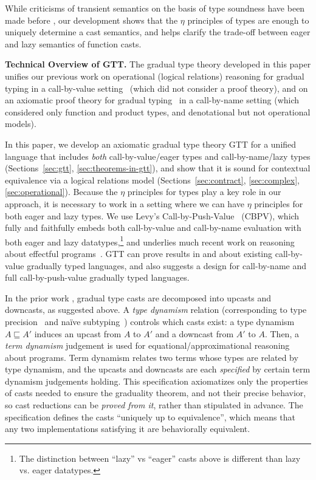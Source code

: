 \documentclass[acmsmall,nonacm]{acmart}
\newcommand{\ltdyn}{\sqsubseteq}
\begin{document}
While criticisms of transient semantics on the basis of type soundness
have been made before \citep{greenmanfelleisen:2018}, our development
shows that the $\eta$ principles of types are enough to uniquely
determine a cast semantics, and helps clarify the trade-off between
eager and lazy semantics of function casts.

\textbf{Technical Overview of GTT.}  The gradual type theory developed
in this paper unifies our previous work on
operational (logical relations) reasoning for gradual typing in a
call-by-value setting~\citep{newahmed18} (which did not consider a proof theory), and on an
axiomatic proof theory for gradual typing~\citep{newlicata2018-fscd} in
a call-by-name setting (which considered only function and product
types, and denotational but not operational models).

In this paper, we develop an axiomatic gradual type theory GTT for a unified
language that includes \emph{both} call-by-value/eager types and
call-by-name/lazy types (Sections~\ref{sec:gtt}, \ref{sec:theorems-in-gtt}), and
show that it is sound for contextual equivalence via a logical relations model
(Sections~\ref{sec:contract}, \ref{sec:complex}, \ref{sec:operational}).
Because the $\eta$ principles for types play a key role in our approach, it is
necessary to work in a setting where we can have $\eta$ principles for both
eager and lazy types.  We use Levy's
Call-by-Push-Value~\citep{levy03cbpvbook} (CBPV), which fully and faithfully
embeds both call-by-value and call-by-name evaluation with both eager and lazy
datatypes,\footnote{The distinction between ``lazy'' vs ``eager'' casts above is
  different than lazy vs. eager datatypes.}  and underlies much recent work on
reasoning about effectful programs~\cite{bauerpretnar13eff,lindley+17frank}.
GTT can prove results in and about existing call-by-value gradually typed
languages, and also suggests a design for call-by-name and full
call-by-push-value gradually typed languages.

In the prior work \cite{newlicata2018-fscd,newahmed18}, gradual type
casts are decomposed into upcasts and downcasts, as suggested above.
%
A \emph{type dynamism}
relation (corresponding to type precision~\cite{refined} and na\"ive
subtyping~\cite{wadler-findler09}) controls which casts exist: a type
dynamism $A \ltdyn A'$ induces an upcast from $A$ to $A'$ and a downcast
from $A'$ to $A$.  Then, a \emph{term dynamism} judgement is used for
equational/approximational reasoning about programs.  Term dynamism
relates two terms whose types are related by type dynamism, and the
upcasts and downcasts are each \emph{specified} by certain term
dynamism judgements holding.
%
This specification axiomatizes only the properties of casts needed to
ensure the graduality theorem, and not their precise behavior, so cast
reductions can be \emph{proved from it}, rather than stipulated in
advance.  The specification defines the casts ``uniquely up to
equivalence'', which means that any two implementations satisfying it
are behaviorally equivalent.
\end{document}
